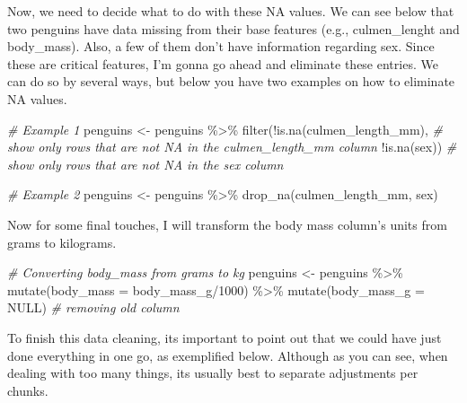 \documentclass[
]{book}
\newenvironment{Shaded}{\begin{snugshade}}{\end{snugshade}}
\newcommand{\AttributeTok}[1]{\textcolor[rgb]{0.77,0.63,0.00}{#1}}
\newcommand{\CommentTok}[1]{\textcolor[rgb]{0.56,0.35,0.01}{\textit{#1}}}
\newcommand{\ConstantTok}[1]{\textcolor[rgb]{0.00,0.00,0.00}{#1}}
\newcommand{\DecValTok}[1]{\textcolor[rgb]{0.00,0.00,0.81}{#1}}
\newcommand{\FunctionTok}[1]{\textcolor[rgb]{0.00,0.00,0.00}{#1}}
\newcommand{\NormalTok}[1]{#1}
\newcommand{\OtherTok}[1]{\textcolor[rgb]{0.56,0.35,0.01}{#1}}
\newcommand{\SpecialCharTok}[1]{\textcolor[rgb]{0.00,0.00,0.00}{#1}}
\begin{document}
Now, we need to decide what to do with these NA values.
We can see below that two penguins have data missing from their base features (e.g., culmen\_lenght and body\_mass).
Also, a few of them don't have information regarding sex.
Since these are critical features, I'm gonna go ahead and eliminate these entries.
We can do so by several ways, but below you have two examples on how to eliminate NA values.

\begin{Shaded}
\begin{Highlighting}[]
\CommentTok{\# Example 1}
\NormalTok{penguins }\OtherTok{\textless{}{-}}\NormalTok{ penguins }\SpecialCharTok{\%\textgreater{}\%} 
  \FunctionTok{filter}\NormalTok{(}\SpecialCharTok{!}\FunctionTok{is.na}\NormalTok{(culmen\_length\_mm),  }\CommentTok{\# show only rows that are not NA in the culmen\_length\_mm column}
         \SpecialCharTok{!}\FunctionTok{is.na}\NormalTok{(sex)) }\CommentTok{\# show only rows that are not NA in the sex column}

\CommentTok{\# Example 2}
\NormalTok{penguins }\OtherTok{\textless{}{-}}\NormalTok{ penguins }\SpecialCharTok{\%\textgreater{}\%} 
  \FunctionTok{drop\_na}\NormalTok{(culmen\_length\_mm, sex)}
\end{Highlighting}
\end{Shaded}

Now for some final touches, I will transform the body mass column's units from grams to kilograms.

\begin{Shaded}
\begin{Highlighting}[]
\CommentTok{\# Converting body\_mass from grams to kg}
\NormalTok{penguins }\OtherTok{\textless{}{-}}\NormalTok{ penguins }\SpecialCharTok{\%\textgreater{}\%} 
  \FunctionTok{mutate}\NormalTok{(}\AttributeTok{body\_mass =}\NormalTok{ body\_mass\_g}\SpecialCharTok{/}\DecValTok{1000}\NormalTok{) }\SpecialCharTok{\%\textgreater{}\%} 
  \FunctionTok{mutate}\NormalTok{(}\AttributeTok{body\_mass\_g =} \ConstantTok{NULL}\NormalTok{)  }\CommentTok{\# removing old column}
\end{Highlighting}
\end{Shaded}

To finish this data cleaning, its important to point out that we could have just done everything in one go, as exemplified below.
Although as you can see, when dealing with too many things, its usually best to separate adjustments per chunks.
\end{document}

